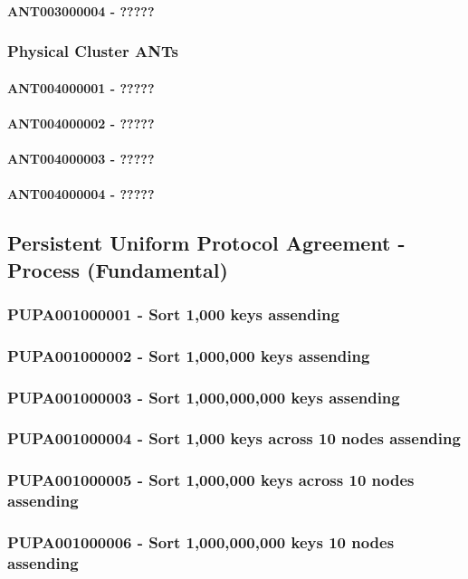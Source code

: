 \documentclass{acm_proc_article-sp}
\begin{document}
\paragraph{ANT003000004 - ?????}
\subsubsection{Physical Cluster ANTs}
\paragraph{ANT004000001 - ?????}
\paragraph{ANT004000002 - ?????}
\paragraph{ANT004000003 - ?????}
\paragraph{ANT004000004 - ?????}
\subsection{Persistent Uniform Protocol Agreement - Process (Fundamental)}
\subsubsection{PUPA001000001 - Sort 1,000 keys assending}
\subsubsection{PUPA001000002 - Sort 1,000,000 keys assending}
\subsubsection{PUPA001000003 - Sort 1,000,000,000 keys assending}
\subsubsection{PUPA001000004 - Sort 1,000 keys across 10 nodes assending}
\subsubsection{PUPA001000005 - Sort 1,000,000 keys across 10 nodes assending}
\subsubsection{PUPA001000006 - Sort 1,000,000,000 keys 10 nodes assending}
\end{document}
